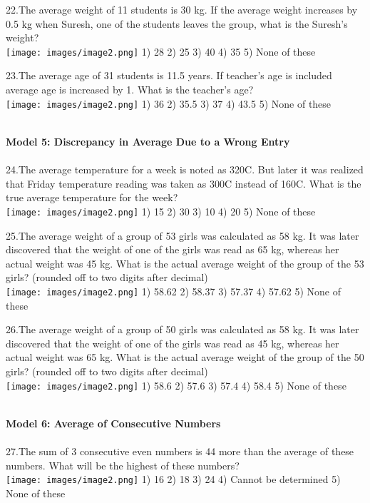 \documentclass[
]{article}
\begin{document}
22.The average weight of 11 students is 30 kg. If the average weight increases by 0.5 kg when Suresh, one of the students leaves the group, what is the Suresh’s weight?  \\
\texttt{[image: images/image2.png]}   1) 28 	2) 25 	3) 40 	4) 35 	5) None of these

23.The average age of 31 students is 11.5 years. If teacher’s age is included average age is increased by 1. What is the teacher's age?  \\
\texttt{[image: images/image2.png]}   1) 36 	2) 35.5 	3) 37 	4) 43.5 	5) None of these

\textbf{\\ Model 5: Discrepancy in Average Due to a Wrong Entry \\}
\\ 24.The average temperature for a week is noted as 320C. But later it was realized that Friday temperature reading was taken as 300C instead of 160C. What is the true average temperature for the week?  \\
\texttt{[image: images/image2.png]}   1) 15 	2) 30 	3) 10 	4) 20 	5) None of these

25.The average weight of a group of 53 girls was calculated as 58 kg. It was later discovered that the weight of one of the girls was read as 65 kg, whereas her actual weight was 45 kg. What is the actual average weight of the group of the 53 girls? (rounded off to two digits after decimal)  \\
\texttt{[image: images/image2.png]}   1) 58.62 	2) 58.37 	3) 57.37 	4) 57.62 	5) None of these

26.The average weight of a group of 50 girls was calculated as 58 kg. It was later discovered that the weight of one of the girls was read as 45 kg, whereas her actual weight was 65 kg. What is the actual average weight of the group of the 50 girls? (rounded off to two digits after decimal)  \\
\texttt{[image: images/image2.png]}   1) 58.6 	2) 57.6 	3) 57.4 	4) 58.4 	5) None of these

\textbf{\\ Model 6: Average of Consecutive Numbers \\}
\\ 27.The  sum  of  3  consecutive  even  numbers  is  44  more  than  the  average  of  these numbers. What will be the highest of these numbers?  \\
\texttt{[image: images/image2.png]}   1) 16 	2) 18 	3) 24 4) Cannot be determined 	5) None of these
\end{document}
